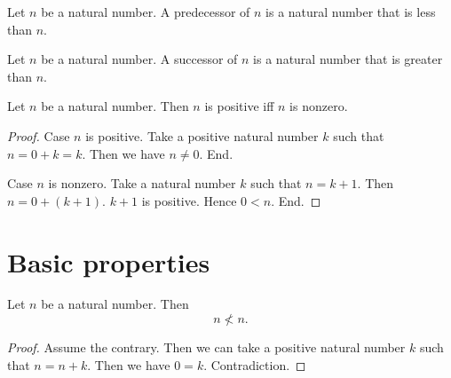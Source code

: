 \documentclass[../arithmetic.tex]{subfiles}
\begin{document}
  \begin{forthel}
    \begin{definition}
      Let $n$ be a natural number.
      A predecessor of $n$ is a natural number that is less than $n$.
    \end{definition}
  \end{forthel}

  \begin{forthel}
    \begin{definition}
      Let $n$ be a natural number.
      A successor of $n$ is a natural number that is greater than $n$.
    \end{definition}
  \end{forthel}

  \begin{forthel}
    \begin{proposition}
      Let $n$ be a natural number.
      Then $n$ is positive iff $n$ is nonzero.
    \end{proposition}
    \begin{proof}
      Case $n$ is positive.
        Take a positive natural number $k$ such that $n = 0 + k = k$.
        Then we have $n \neq 0$.
      End.

      Case $n$ is nonzero.
        Take a natural number $k$ such that $n = k + 1$.
        Then $n = 0 + (k + 1)$.
        $k + 1$ is positive.
        Hence $0 < n$.
      End.
    \end{proof}
  \end{forthel}


  \section{Basic properties}

  \begin{forthel}
    \begin{proposition}
      Let $n$ be a natural number.
      Then \[ n \nless n. \]
    \end{proposition}
    \begin{proof}
      Assume the contrary.
      Then we can take a positive natural number $k$ such that $n = n + k$.
      Then we have $0 = k$.
      Contradiction.
    \end{proof}
  \end{forthel}
\end{document}
